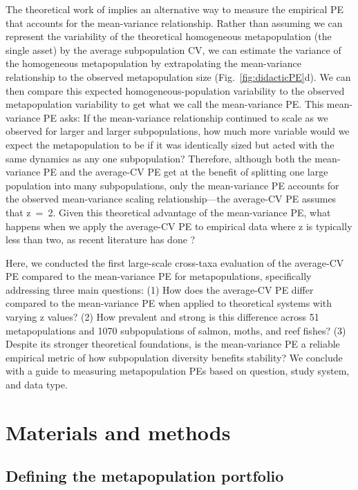 The theoretical work of \citet{tilman1998} implies an alternative way to
measure the empirical PE that accounts for the mean-variance relationship.
Rather than assuming we can represent the variability of the theoretical
homogeneous metapopulation (the single asset) by the average subpopulation CV,
we can estimate the variance of the homogeneous metapopulation by extrapolating
the mean-variance relationship to the observed metapopulation size
(Fig.~\ref{fig:didacticPE}d). We can then compare this expected
homogeneous-population variability to the observed metapopulation variability
to get what we call the mean-variance PE. This mean-variance PE asks: If the
mean-variance relationship continued to scale as we observed for larger and
larger subpopulations, how much more variable would we expect the
metapopulation to be if it was identically sized but acted with the same
dynamics as any one subpopulation? Therefore, although both the mean-variance
PE and the average-CV PE get at the benefit of splitting one large population
into many subpopulations, only the mean-variance PE accounts for the observed
mean-variance scaling relationship---the average-CV PE assumes that z~=~2.
Given this theoretical advantage of the mean-variance PE, what happens when we
apply the average-CV PE to empirical data where z is typically less than two,
as recent literature has done \citep{secor2009, schindler2010,
  carlson2011}?

Here, we conducted the first large-scale cross-taxa evaluation of the
average-CV PE compared to the mean-variance PE for metapopulations,
specifically addressing three main questions: (1) How does the average-CV PE
differ compared to the mean-variance PE when applied to theoretical systems
with varying z values? (2) How prevalent and strong is this difference across
51 metapopulations and 1070 subpopulations of
salmon, moths, and reef fishes? (3) Despite its stronger theoretical
foundations, is the mean-variance PE a reliable empirical metric of how
subpopulation diversity benefits stability? We conclude with a guide to
measuring metapopulation PEs based on question, study system, and data type.

\section{Materials and methods}

\subsection{Defining the metapopulation portfolio}

